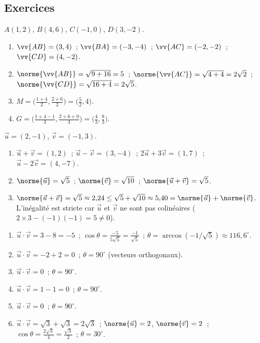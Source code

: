 
\subsection*{Exercices}


$A(1,2)$, $B(4,6)$, $C(-1,0)$, $D(3,-2)$.
\begin{enumerate}
  \item $\vv{AB}=(3,4)$~; $\vv{BA}=(-3,-4)$~; $\vv{AC}=(-2,-2)$~; $\vv{CD}=(4,-2)$.
  \item $\norme{\vv{AB}}=\sqrt{9+16}=5$~; $\norme{\vv{AC}}=\sqrt{4+4}=2\sqrt{2}$~;
        $\norme{\vv{CD}}=\sqrt{16+4}=2\sqrt{5}$.
  \item $M=\bigl(\tfrac{1+4}{2},\tfrac{2+6}{2}\bigr)=\bigl(\tfrac{5}{2},4\bigr)$.
  \item $G=\bigl(\tfrac{1+4-1}{3},\tfrac{2+6+0}{3}\bigr)=\bigl(\tfrac{4}{3},\tfrac{8}{3}\bigr)$.
\end{enumerate}


$\vec{u}=(2,-1)$, $\vec{v}=(-1,3)$.
\begin{enumerate}
  \item $\vec{u}+\vec{v}=(1,2)$~; $\vec{u}-\vec{v}=(3,-4)$~;
        $2\vec{u}+3\vec{v}=(1,7)$~; $\vec{u}-2\vec{v}=(4,-7)$.
  \item $\norme{\vec{u}}=\sqrt{5}$~; $\norme{\vec{v}}=\sqrt{10}$~;
        $\norme{\vec{u}+\vec{v}}=\sqrt{5}$.
  \item $\norme{\vec{u}+\vec{v}}=\sqrt{5}\approx2{,}24\leq\sqrt{5}+\sqrt{10}\approx5{,}40=\norme{\vec{u}}+\norme{\vec{v}}$.\checkmark\quad
        L'in\'egalit\'e est stricte car $\vec{u}$ et $\vec{v}$ ne sont pas colin\'eaires
        ($2\times3-(-1)(-1)=5\ne0$).
\end{enumerate}


\begin{enumerate}
  \item $\vec{u}\cdot\vec{v}=3-8=-5$~; $\cos\theta=\frac{-5}{5\sqrt{5}}=\frac{-1}{\sqrt{5}}$~;
        $\theta=\arccos(-1/\sqrt{5})\approx116{,}6^{\circ}$.
  \item $\vec{u}\cdot\vec{v}=-2+2=0$~; $\theta=90^{\circ}$ (vecteurs orthogonaux).
  \item $\vec{u}\cdot\vec{v}=0$~; $\theta=90^{\circ}$.
  \item $\vec{u}\cdot\vec{v}=1-1=0$~; $\theta=90^{\circ}$.
  \item $\vec{u}\cdot\vec{v}=0$~; $\theta=90^{\circ}$.
  \item $\vec{u}\cdot\vec{v}=\sqrt{3}+\sqrt{3}=2\sqrt{3}$~;
        $\norme{\vec{u}}=2$, $\norme{\vec{v}}=2$~;
        $\cos\theta=\frac{2\sqrt{3}}{4}=\frac{\sqrt{3}}{2}$~; $\theta=30^{\circ}$.
\end{enumerate}


